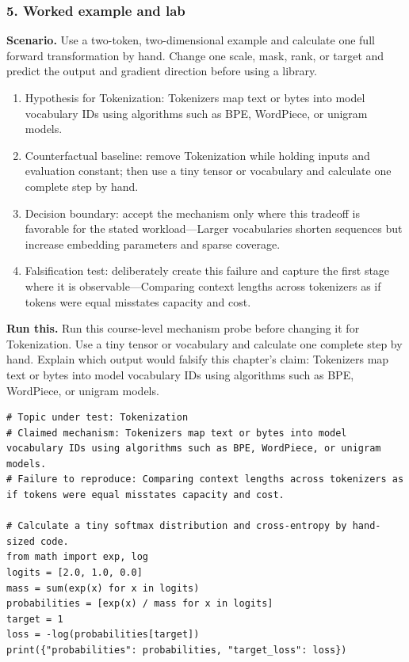\subsubsection*{5. Worked example and lab}
\textbf{Scenario.} Use a two-token, two-dimensional example and calculate one full forward transformation by hand. Change one scale, mask, rank, or target and predict the output and gradient direction before using a library.
\begin{enumerate}
\item Hypothesis for Tokenization: Tokenizers map text or bytes into model vocabulary IDs using algorithms such as BPE, WordPiece, or unigram models.
\item Counterfactual baseline: remove Tokenization while holding inputs and evaluation constant; then use a tiny tensor or vocabulary and calculate one complete step by hand.
\item Decision boundary: accept the mechanism only where this tradeoff is favorable for the stated workload—Larger vocabularies shorten sequences but increase embedding parameters and sparse coverage.
\item Falsification test: deliberately create this failure and capture the first stage where it is observable—Comparing context lengths across tokenizers as if tokens were equal misstates capacity and cost.
\end{enumerate}
\textbf{Run this.} Run this course-level mechanism probe before changing it for Tokenization. Use a tiny tensor or vocabulary and calculate one complete step by hand. Explain which output would falsify this chapter's claim: Tokenizers map text or bytes into model vocabulary IDs using algorithms such as BPE, WordPiece, or unigram models.
\begin{Verbatim}[fontsize=\scriptsize]
# Topic under test: Tokenization
# Claimed mechanism: Tokenizers map text or bytes into model vocabulary IDs using algorithms such as BPE, WordPiece, or unigram models.
# Failure to reproduce: Comparing context lengths across tokenizers as if tokens were equal misstates capacity and cost.

# Calculate a tiny softmax distribution and cross-entropy by hand-sized code.
from math import exp, log
logits = [2.0, 1.0, 0.0]
mass = sum(exp(x) for x in logits)
probabilities = [exp(x) / mass for x in logits]
target = 1
loss = -log(probabilities[target])
print({"probabilities": probabilities, "target_loss": loss})
\end{Verbatim}
